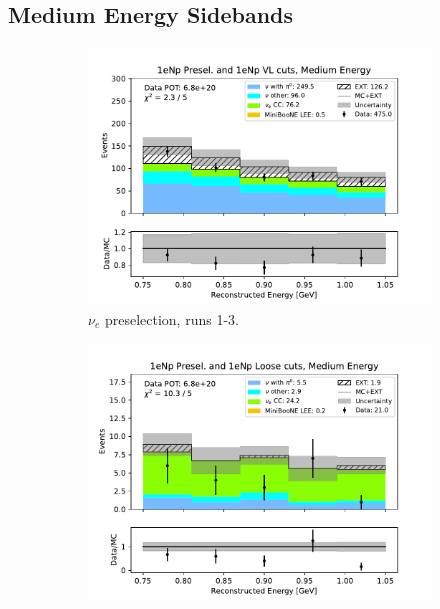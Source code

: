 \subsection{Medium Energy Sidebands}
\label{sec:MediumEnergySidebands}

\begin{figure}[H]
    \centering
    \begin{subfigure}{0.33\linewidth}
        \includegraphics[width=\linewidth]{technote/Sidebands/Figures/NearSideband/near_sideband_reco_e_run123_NP_NP_MEDIUM_ENERGY.pdf}
        \caption{$\nu_e$ preselection, runs 1-3.}
    \end{subfigure}%
    \begin{subfigure}{0.33\linewidth}
        \includegraphics[width=\linewidth]{technote/Sidebands/Figures/NearSideband/near_sideband_reco_e_run123_NP_NPL_MEDIUM_ENERGY.pdf}

\end{subfigure}
\end{figure}

